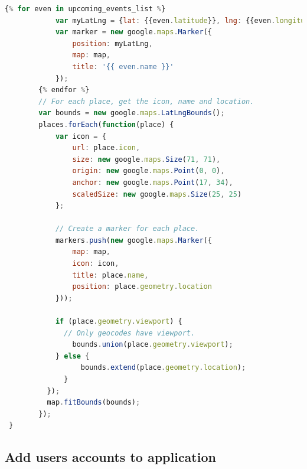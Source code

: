 \documentclass[letterpaper,10pt,onecolumn]{IEEEtran} %
\begin{document}
\begin{enumerate}
\begin{center}
\begin{lstlisting}[language=JavaScript]
        {% for even in upcoming_events_list %}
            var myLatLng = {lat: {{even.latitude}}, lng: {{even.longitude}}};
            var marker = new google.maps.Marker({
                position: myLatLng,
                map: map,
                title: '{{ even.name }}'
            });
        {% endfor %}
        // For each place, get the icon, name and location.
        var bounds = new google.maps.LatLngBounds();
        places.forEach(function(place) {
            var icon = {
                url: place.icon,
                size: new google.maps.Size(71, 71),
                origin: new google.maps.Point(0, 0),
                anchor: new google.maps.Point(17, 34),
                scaledSize: new google.maps.Size(25, 25)
            };

            // Create a marker for each place.
            markers.push(new google.maps.Marker({
                map: map,
                icon: icon,
                title: place.name,
                position: place.geometry.location
            }));
            
            if (place.geometry.viewport) {
              // Only geocodes have viewport.
                bounds.union(place.geometry.viewport);
            } else {
                  bounds.extend(place.geometry.location);
              }
          });
          map.fitBounds(bounds);
        });
 }
\end{lstlisting}
\end{center}

\end{enumerate}

\subsection{Add users accounts to application}
\end{document}
